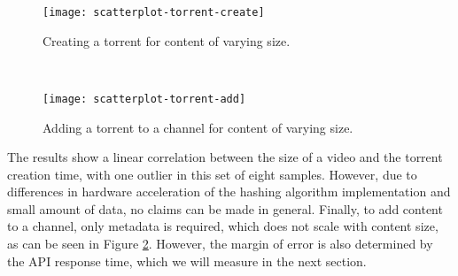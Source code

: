\begin{minipage}{.49\textwidth}
\begin{figure}[H]
	\centering %
	\texttt{[image: scatterplot-torrent-create]}
	\caption{Creating a torrent for content of varying size.}
	\label{fig:scatterplot-torrent-create}
\end{figure}
\end{minipage}
~
\begin{minipage}{.49\textwidth}
\begin{figure}[H]
	\centering %
	\texttt{[image: scatterplot-torrent-add]}
	\caption{Adding a torrent to a channel for content of varying size.}
	\label{fig:scatterplot-torrent-add}
\end{figure}
\end{minipage}

The results show a linear correlation between the size of a video and the torrent creation time, with one outlier in this set of eight samples.
However, due to differences in hardware acceleration of the hashing algorithm implementation and small amount of data, no claims can be made in general.
Finally, to add content to a channel, only metadata is required, which does not scale with content size, as can be seen in Figure \ref{fig:scatterplot-torrent-add}.
However, the margin of error is also determined by the API response time, which we will measure in the next section.



